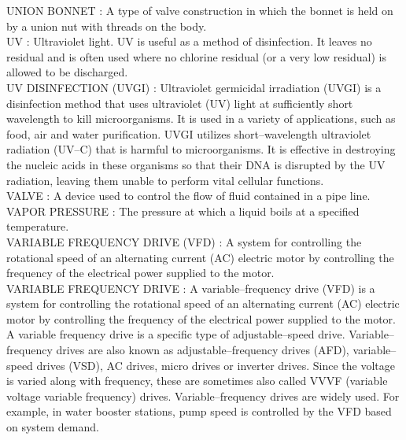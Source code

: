 \vspace{0.15cm}
UNION BONNET :   A type of valve construction in which the bonnet is held on by a union nut with threads on the body.\\
\vspace{0.15cm}
UV :  Ultraviolet light. UV is useful as a method of disinfection. It leaves no residual and is often used where no chlorine residual (or a very low residual) is allowed to be discharged.\\
\vspace{0.15cm}
UV DISINFECTION (UVGI) :   Ultraviolet germicidal irradiation (UVGI) is a disinfection method that uses ultraviolet (UV) light at sufficiently short wavelength to kill microorganisms. It is used in a variety of applications, such as food, air and water purification. UVGI utilizes short–wavelength ultraviolet radiation (UV–C) that is harmful to microorganisms. It is effective in destroying the nucleic acids in these organisms so that their DNA is disrupted by the UV radiation, leaving them unable to perform vital cellular functions.\\
\vspace{0.15cm}
VALVE :   A device used to control the flow of fluid contained in a pipe line.\\
\vspace{0.15cm}
VAPOR PRESSURE :   The pressure at which a liquid boils at a specified temperature.\\
\vspace{0.15cm}
VARIABLE FREQUENCY DRIVE (VFD) :   A system for controlling the rotational speed of an alternating current (AC) electric motor by controlling the frequency of the electrical power supplied to the motor.\\
\vspace{0.15cm}
VARIABLE FREQUENCY DRIVE :   A variable–frequency drive (VFD) is a system for controlling the rotational speed of an alternating current (AC) electric motor by controlling the frequency of the electrical power supplied to the motor. A variable frequency drive is a specific type of adjustable–speed drive. Variable–frequency drives are also known as adjustable–frequency drives (AFD), variable–speed drives (VSD), AC drives, micro drives or inverter drives. Since the voltage is varied along with frequency, these are sometimes also called VVVF (variable voltage variable frequency) drives. Variable–frequency drives are widely used. For example, in water booster stations, pump speed is controlled by the VFD based on system demand.\\
